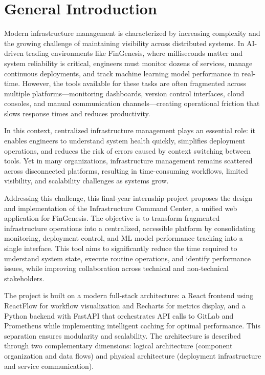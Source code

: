 \chapter*{General Introduction}

Modern infrastructure management is characterized by increasing complexity and the growing challenge of maintaining visibility across distributed systems. In AI-driven trading environments like FinGenesis, where milliseconds matter and system reliability is critical, engineers must monitor dozens of services, manage continuous deployments, and track machine learning model performance in real-time. However, the tools available for these tasks are often fragmented across multiple platforms—monitoring dashboards, version control interfaces, cloud consoles, and manual communication channels—creating operational friction that slows response times and reduces productivity.

In this context, centralized infrastructure management plays an essential role: it enables engineers to understand system health quickly, simplifies deployment operations, and reduces the risk of errors caused by context switching between tools. Yet in many organizations, infrastructure management remains scattered across disconnected platforms, resulting in time-consuming workflows, limited visibility, and scalability challenges as systems grow.

Addressing this challenge, this final-year internship project proposes the design and implementation of the Infrastructure Command Center, a unified web application for FinGenesis. The objective is to transform fragmented infrastructure operations into a centralized, accessible platform by consolidating monitoring, deployment control, and ML model performance tracking into a single interface. This tool aims to significantly reduce the time required to understand system state, execute routine operations, and identify performance issues, while improving collaboration across technical and non-technical stakeholders.

The project is built on a modern full-stack architecture: a React frontend using ReactFlow for workflow visualization and Recharts for metrics display, and a Python backend with FastAPI that orchestrates API calls to GitLab and Prometheus while implementing intelligent caching for optimal performance. This separation ensures modularity and scalability. The architecture is described through two complementary dimensions: logical architecture (component organization and data flows) and physical architecture (deployment infrastructure and service communication).


